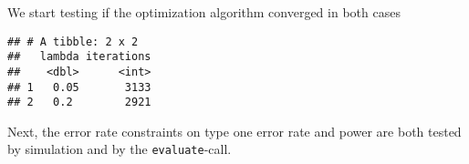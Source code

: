 \documentclass[
]{book}
\newenvironment{Shaded}{\begin{snugshade}}{\end{snugshade}}
\newcommand{\DataTypeTok}[1]{\textcolor[rgb]{0.13,0.29,0.53}{#1}}
\newcommand{\KeywordTok}[1]{\textcolor[rgb]{0.13,0.29,0.53}{\textbf{#1}}}
\newcommand{\NormalTok}[1]{#1}
\newcommand{\OperatorTok}[1]{\textcolor[rgb]{0.81,0.36,0.00}{\textbf{#1}}}
\newcommand{\StringTok}[1]{\textcolor[rgb]{0.31,0.60,0.02}{#1}}
\begin{document}
We start testing if the optimization algorithm converged in both cases

\begin{Shaded}
\end{Shaded}

\begin{verbatim}
## # A tibble: 2 x 2
##   lambda iterations
##    <dbl>      <int>
## 1   0.05       3133
## 2   0.2        2921
\end{verbatim}

Next, the error rate constraints on type one error rate and power are both
tested by simulation and by the \texttt{evaluate}-call.
\end{document}
